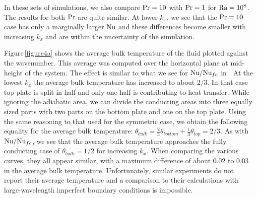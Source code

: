 In these sets of simulations, we also compare $\text{Pr} = 10$ with $\text{Pr} = 1$
for $\text{Ra} = 10^8$.  The results for both $\text{Pr}$ are quite similar.  At lower
$k_x$, we see that the $\text{Pr} =10$ case has only a marginally larger $\text{Nu}$
and these differences become smaller with increasing $k_x$ and are within the
uncertainty of the simulation.

%
%
Figure\,\ref{figure4a} shows the average bulk temperature of the fluid plotted
against the wavenumber.  This average was computed over the horizontal plane
at mid-height of the system.  The effect is similar to what we see for
$\text{Nu}/\text{Nu}_{fc}$ in .  At the lowest $k_x$ the average
bulk temperature has increased to about $2/3$.  In that case top plate is
split in half and only one half is contributing to heat transfer.  While
ignoring the adiabatic area, we can divide the conducting areas into three
equally sized parts with two parts on the bottom plate and one on the top
plate.  Using the same reasoning to that used for the symmetric case, we
obtain the following equality for the average bulk temperature: $\theta_{bulk}
= \frac{2}{3} \theta_{bottom} + \frac{1}{3} \theta_{top} = 2/3$.  As with
$\text{Nu}/\text{Nu}_{fc}$, we see that the average bulk temperature approaches the
fully conducting case of $\theta_{bulk}=1/2$ for increasing $k_x$.  When
comparing the various curves, they all appear similar, with a maximum
difference of about 0.02 to 0.03 in the average bulk temperature.
Unfortunately, similar experiments do not report their average
temperature \citep{Wang2017} and a comparison to their calculations with large-wavelength
imperfect boundary conditions is impossible.

